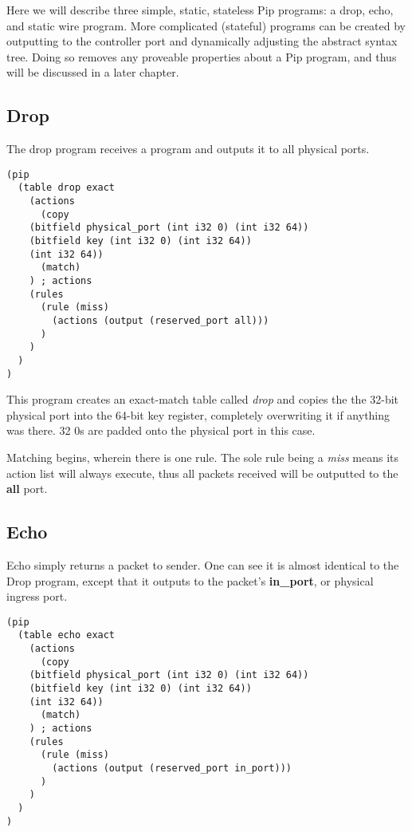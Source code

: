 \documentclass{article}
\begin{document}
Here we will describe three simple, static, stateless Pip programs: a drop, echo, and static wire program. More complicated (stateful) programs can be created by outputting to the controller port and dynamically adjusting the abstract syntax tree. Doing so removes any proveable properties about a Pip program, and thus will be discussed in a later chapter.

\subsection{Drop}
The drop program receives a program and outputs it to all physical ports.
\begin{verbatim}
(pip
  (table drop exact
    (actions
      (copy
	(bitfield physical_port (int i32 0) (int i32 64))
	(bitfield key (int i32 0) (int i32 64))
	(int i32 64))
      (match)
    ) ; actions
    (rules
      (rule (miss)
        (actions (output (reserved_port all)))
      )
    )
  )
)
\end{verbatim}
This program creates an exact-match table called \textit{drop} and copies the the 32-bit physical port into the 64-bit key register, completely overwriting it if anything was there. 32 0s are padded onto the physical port in this case.

Matching begins, wherein there is one rule. The sole rule being a \textit{miss} means its action list will always execute, thus all packets received will be outputted to the \textbf{all} port.
\subsection{Echo}
Echo simply returns a packet to sender. One can see it is almost identical to the Drop program, except that it outputs to the packet's \textbf{in\_port}, or physical ingress port.
\begin{verbatim}
(pip
  (table echo exact
    (actions
      (copy
	(bitfield physical_port (int i32 0) (int i32 64))
	(bitfield key (int i32 0) (int i32 64))
	(int i32 64))
      (match)
    ) ; actions
    (rules
      (rule (miss)
        (actions (output (reserved_port in_port)))
      )
    )
  )
)
\end{verbatim}
\end{document}
